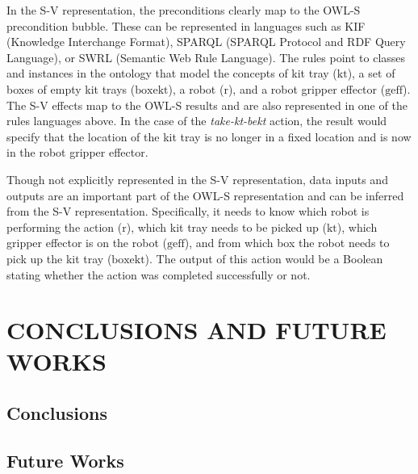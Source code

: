 \documentclass[a4paper, 10pt, conference]{ieeeconf}      %
\begin{document}
In the S-V representation, the preconditions clearly map to the OWL-S precondition bubble. These can be represented in languages such as KIF (Knowledge Interchange Format), SPARQL (SPARQL Protocol and RDF Query Language), or SWRL (Semantic Web Rule Language). The rules point to classes and instances in the ontology that model the concepts of kit tray ($\mathrm{kt}$), a set of boxes of empty kit trays ($\mathrm{boxekt}$), a robot ($\mathrm{r}$), and a robot gripper effector ($\mathrm{geff}$). The S-V effects map to the OWL-S results and are also represented in one of the rules languages above. In the case of the \textsl{take-kt-bekt} action, the result would specify that the location of the kit tray is no longer in a fixed location and is now in the robot gripper effector.

Though not explicitly represented in the S-V representation, data inputs and outputs are an important part of the OWL-S representation and can be inferred from the S-V representation. Specifically, it needs to know which robot is performing the action ($\mathrm{r}$), which kit tray needs to be picked up ($\mathrm{kt}$), which gripper effector is on the robot ($\mathrm{geff}$), and from which box the robot needs to pick up the kit tray ($\mathrm{boxekt}$). The output of this action would be a Boolean stating whether the action was completed successfully or not.


\section{CONCLUSIONS AND FUTURE WORKS}
\label{sect:Conclusions}

\subsection{Conclusions}




\subsection{Future Works}



\end{document}
